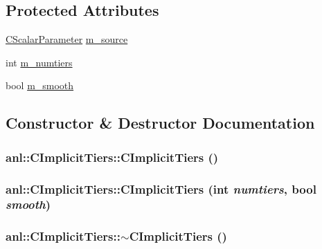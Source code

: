\subsection*{Protected Attributes}
\begin{DoxyCompactItemize}
\item 
\hyperlink{classanl_1_1CScalarParameter}{CScalarParameter} \hyperlink{classanl_1_1CImplicitTiers_ade315fdea7760e6433a514bd16587548}{m\_\-source}
\item 
int \hyperlink{classanl_1_1CImplicitTiers_adf86f9921bbf1130beaf17734b75d59f}{m\_\-numtiers}
\item 
bool \hyperlink{classanl_1_1CImplicitTiers_a15bc03072bcabcc244aa1f384fee4f96}{m\_\-smooth}
\end{DoxyCompactItemize}


\subsection{Constructor \& Destructor Documentation}
\hypertarget{classanl_1_1CImplicitTiers_aa05c90fd55c9ba232439e00498215236}{
\subsubsection[{CImplicitTiers}]{\setlength{\rightskip}{0pt plus 5cm}anl::CImplicitTiers::CImplicitTiers ()}}
\label{classanl_1_1CImplicitTiers_aa05c90fd55c9ba232439e00498215236}
\hypertarget{classanl_1_1CImplicitTiers_a4ad35a52b15bf013589efb0d82cfe096}{
\subsubsection[{CImplicitTiers}]{\setlength{\rightskip}{0pt plus 5cm}anl::CImplicitTiers::CImplicitTiers (int {\em numtiers}, \/  bool {\em smooth})}}
\label{classanl_1_1CImplicitTiers_a4ad35a52b15bf013589efb0d82cfe096}
\hypertarget{classanl_1_1CImplicitTiers_a59ef4a8b26baff0614ef8872673e7a55}{
\subsubsection[{$\sim$CImplicitTiers}]{\setlength{\rightskip}{0pt plus 5cm}anl::CImplicitTiers::$\sim$CImplicitTiers ()}}
\label{classanl_1_1CImplicitTiers_a59ef4a8b26baff0614ef8872673e7a55}


